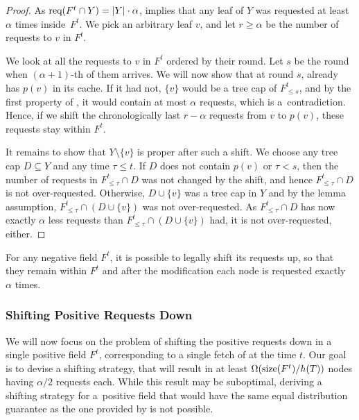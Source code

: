 \begin{proof}
As $\textrm{req}(F^t \cap Y) = |Y| \cdot \alpha$, 
implies that any leaf of $Y$ was requested at least $\alpha$ times
inside~$F^t$. We pick an arbitrary leaf $v$, and let $r \geq \alpha$ be the
number of requests to $v$ in $F^t$.

We look at all the requests to $v$ in $F^t$ ordered by their round. Let $s$ be
the round when $(\alpha+1)$-th of them arrives. We will now show that at round
$s$, \ALGTC already has $p(v)$ in its cache. If it had not, $\{v\}$ would be a
tree cap of $F^t_{\leq s}$, and by the first property of
, it would contain at most $\alpha$
requests, which is a~contradiction. Hence, if we shift the chronologically
last $r - \alpha$ requests from $v$ to $p(v)$, these requests stay within
$F^t$.

It remains to show that $Y \setminus \{v\}$ is proper after such a shift. We
choose any tree cap $D \subseteq Y$ and any time \mbox{$\tau \leq t$}. If $D$
does not contain $p(v)$ or $\tau < s$, then the number of requests in
$F^t_{\leq \tau} \cap D$ was not changed by the shift, and hence $F^t_{\leq
\tau} \cap D$ is not over-requested. Otherwise, $D \cup \{v\}$ was a tree cap
in $Y$ and by the lemma assumption, $F^t_{\leq \tau} \cap (D \cup \{v\})$ was
not over-requested. As $F^t_{\leq \tau} \cap D$ has now exactly $\alpha$ less
requests than $F^t_{\leq \tau} \cap (D \cup \{v\})$ had, it is not
over-requested, either.
\end{proof}

\begin{corollary}
\label{cor:crucial_lemma_neg}
For any negative field $F^t$, it is possible to legally shift its requests up,
so that they remain within $F^t$ and after the modification each node is
requested exactly $\alpha$ times.
\end{corollary}



\subsubsection{Shifting Positive Requests Down}
\label{sec:positive_shifting}

We will now focus on the problem of shifting the positive requests down in a
single positive field $F^t$, corresponding to a single fetch of \ALGTC at the
time $t$. Our goal is to devise a shifting strategy, that will result in at
least $\Omega(\textrm{size}(F^t)/h(T))$ nodes having $\alpha/2$ requests each. While
this result may be suboptimal, deriving a shifting strategy for a~positive
field that would have the same equal distribution guarantee as the one
provided by  is not possible.

